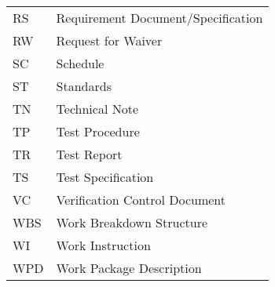 \begin{tabular}{l l}
RS & Requirement Document/Specification \\
RW & Request for Waiver \\
SC & Schedule \\
ST & Standards \\
TN & Technical Note \\
TP & Test Procedure \\
TR & Test Report \\
TS & Test Specification \\
VC & Verification Control Document \\
WBS & Work Breakdown Structure \\
WI & Work Instruction \\
WPD & Work Package Description
\end{tabular}
